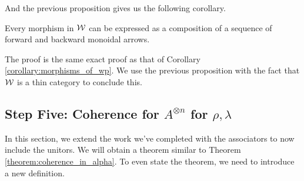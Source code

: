 And the previous proposition gives us the following corollary.

\begin{corollary}\label{corollary:morphisms_of_w}
    Every morphism in $\mathcal{W}$ can be expressed as a composition of 
    a sequence of forward and backward monoidal arrows.
\end{corollary}

\begin{prf}
The proof is the same exact proof as that of Corollary \ref{corollary:morphisms_of_wp}. 
We use the previous proposition with the fact that $\mathcal{W}$ is a thin category to conclude this. 
\end{prf}




\newpage
\subsection*{Step Five: Coherence for $A^{\otimes n}$ for $\rho, \lambda$}

In this section, we extend the work we've completed with 
the associators to now include the unitors. We will obtain a theorem 
similar to Theorem \ref{theorem:coherence_in_alpha}. To even state the 
theorem, we need to introduce a new definition. 


